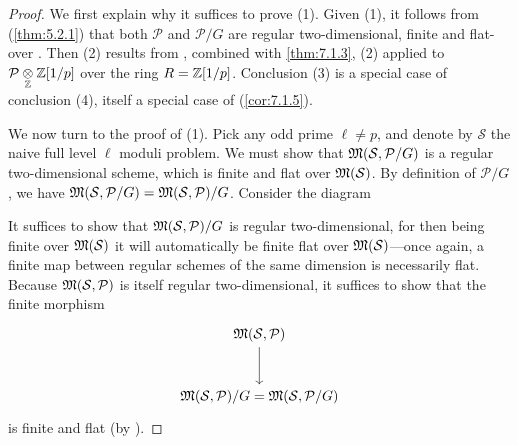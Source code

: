 \begin{proof}
We first explain why it suffices to prove (1). Given (1), it follows from (\ref{thm:5.2.1}) that both $\mathcal{P}$ and $\mathcal{P}/G$ are regular two-dimensional, finite and flat-over \Ell. Then (2) results from \cite[V, 3.8]{AK1}, combined with \ref{thm:7.1.3}, (2) applied to $\mathcal{P} \underset{\mathbb{Z}}{\otimes} \mathbb{Z}[1/p]$ over the ring $R = \mathbb{Z}[1/p]$. Conclusion (3) is a special case of conclusion (4), itself a special case of (\ref{cor:7.1.5}).

We now turn to the proof of (1). Pick any odd prime $\ell \neq p$, and denote by $\mathcal{S}$ the naive full level $\ell$ moduli problem. We must show that $\mathfrak{M}(\mathcal{S}, \mathcal{P}/G)$ is a regular two-dimensional scheme, which is finite and flat over $\mathfrak{M}(\mathcal{S})$. By definition of $\mathcal{P}/G$, we have $\mathfrak{M}(\mathcal{S}, \mathcal{P}/G) = \mathfrak{M}(\mathcal{S}, \mathcal{P})/G$. Consider the diagram
\begin{center}
\footnotesize
{}
\end{center}
It suffices to show that $\mathfrak{M}(\mathcal{S}, \mathcal{P})/G$ is regular two-dimensional, for then being finite over $\mathfrak{M}(\mathcal{S})$ it will automatically be finite flat over $\mathfrak{M}(\mathcal{S})$---once again, a finite map between regular schemes of the same dimension is necessarily flat. Because $\mathfrak{M}(\mathcal{S}, \mathcal{P})$ is itself regular two-dimensional, it suffices to show that the finite morphism
\[
\begin{tikzcd}[column sep=large, row sep=large]
\Mfrak(\mathcal{S},\mathcal{P}) \arrow[d] \\
\Mfrak(\mathcal{S},\mathcal{P})/G = \Mfrak(\mathcal{S},\mathcal{P}/G)
\end{tikzcd}
\]
is finite and flat (by \cite[VII, 4.8]{AK1}).


\end{proof}
